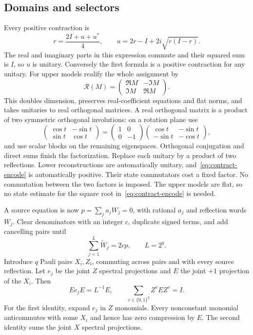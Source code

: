 \subsection{Domains and selectors}
Every positive contraction is
\begin{equation}\label{eq:contract-encode}
 r=\frac{2I+u+u^*}{4},\qquad
 u=2r-I+2i\sqrt{r(I-r)}.
\end{equation}
The real and imaginary parts in this expression commute and their squared sum is $I$, so $u$ is unitary. Conversely the first formula is a positive contraction for any unitary. For upper models realify the whole assignment by
\[
 \mathcal R(M)=\begin{pmatrix}\Re M&-\Im M\\\Im M&\Re M\end{pmatrix}.
\]
This doubles dimension, preserves real-coefficient equations and flat norms, and takes unitaries to real orthogonal matrices. A real orthogonal matrix is a product of two symmetric orthogonal involutions: on a rotation plane use
\[
 \begin{pmatrix}\cos t&-\sin t\\\sin t&\cos t\end{pmatrix}
 =\begin{pmatrix}1&0\\0&-1\end{pmatrix}
  \begin{pmatrix}\cos t&-\sin t\\-\sin t&-\cos t\end{pmatrix},
\]
and use scalar blocks on the remaining eigenspaces. Orthogonal conjugation and direct sums finish the factorization. Replace each unitary by a product of two reflections. Lower reconstructions are automatically unitary, and~\eqref{eq:contract-encode} is automatically positive. Their state commutators cost a fixed factor. No commutation between the two factors is imposed. The upper models are flat, so no state estimate for the square root in~\eqref{eq:contract-encode} is needed.

A source equation is now $p=\sum_j a_jW_j=0$, with rational $a_j$ and reflection words $W_j$. Clear denominators with an integer $c$, duplicate signed terms, and add cancelling pairs until
\[
 \sum_{j=1}^L\widetilde W_j=2cp,\qquad L=2^q.
\]
Introduce $q$ Pauli pairs $X_i,Z_i$, commuting across pairs and with every source reflection. Let $e_j$ be the joint $Z$ spectral projections and $E$ the joint $+1$ projection of the $X_i$. Then
\begin{equation}\label{eq:selector}
 Ee_jE=L^{-1}E,\qquad \sum_{v\in\{0,1\}^q}Z^vEZ^v=I.
\end{equation}
For the first identity, expand $e_j$ in $Z$ monomials. Every nonconstant monomial anticommutes with some $X_i$ and hence has zero compression by $E$. The second identity sums the joint $X$ spectral projections.

